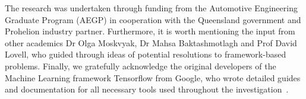 The research was undertaken through funding from the Automotive Engineering Graduate Program (AEGP) in cooperation with the Queensland government and Prohelion industry partner.
Furthermore, it is worth mentioning the input from other academics Dr Olga Moskvyak, Dr Mahsa Baktashmotlagh and Prof David Lovell, who guided through ideas of potential resolutions to framework-based problems.
Finally, we gratefully acknowledge the original developers of the Machine Learning framework Tensorflow from Google, who wrote detailed guides and documentation for all necessary tools used throughout the investigation~\cite{tensorflow2015-whitepaper}.
